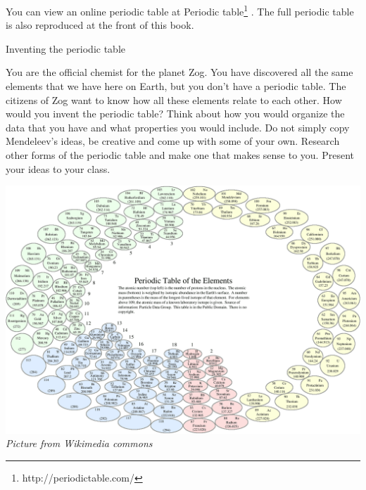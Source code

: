       \label{m38760*eip-773}You can view an online periodic table at Periodic table\footnote{http://periodictable.com/}
        . The full periodic table is also reproduced at the front of this book.\par \label{m38760*eip-400}
\begin{activity}{Inventing the periodic table}
            \nopagebreak
            \label{m38760*eip-603}
\begin{minipage}{.5\textwidth}
You are the official chemist for the planet Zog. You have discovered all the same elements that we have here on Earth, but you don't have a periodic table. The citizens of Zog want to know how all these elements relate to each other. How would you invent the periodic table? Think about how you would organize the data that you have and what properties you would include. Do not simply copy Mendeleev's ideas, be creative and come up with some of your own. Research other forms of the periodic table and make one that makes sense to you. Present your ideas to your class. 
\end{minipage}
\begin{minipage}{.5\textwidth}
\begin{center}
\includegraphics[width=.8\textwidth]{photos/Circular_periodic_table.png}\\
\textsl{Picture from Wikimedia commons}
\end{center}
\end{minipage}

\end{activity}            
